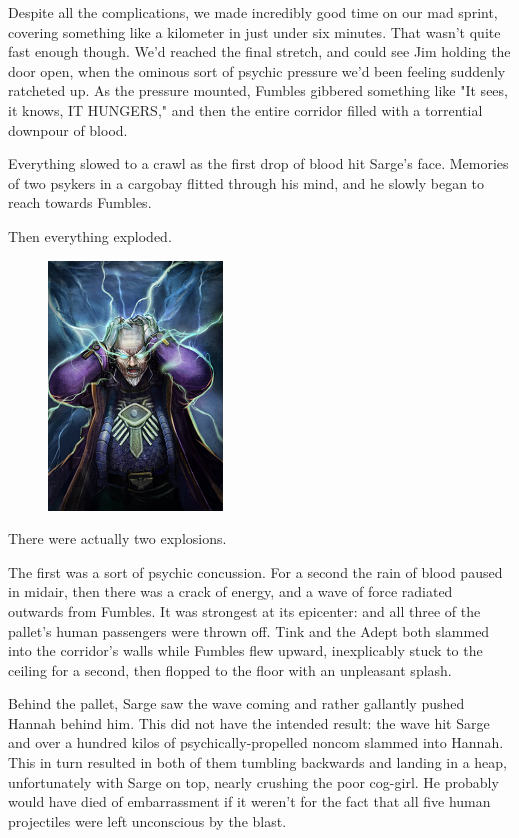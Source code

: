 Despite all the complications, we made incredibly good time on our mad sprint, covering something like a kilometer in just under six minutes. 
That wasn't quite fast enough though. 
We'd reached the final stretch, and could see Jim holding the door open, when the ominous sort of psychic pressure we'd been feeling suddenly ratcheted up. 
As the pressure mounted, Fumbles gibbered something like "It sees, it knows, IT HUNGERS," and then the entire corridor filled with a torrential downpour of blood. 


Everything slowed to a crawl as the first drop of blood hit Sarge's face. 
Memories of two psykers in a cargobay flitted through his mind, and he slowly began to reach towards Fumbles. 


Then everything exploded.
\begin{figure}
	\begin{center}
		\includegraphics[width=\figwidth]{pics/12/66.png}
	\end{center}
\end{figure}
There were actually two explosions. 


The first was a sort of psychic concussion. 
For a second the rain of blood paused in midair, then there was a crack of energy, and a wave of force radiated outwards from Fumbles. 
It was strongest at its epicenter: 
and all three of the pallet's human passengers were thrown off. 
Tink and the Adept both slammed into the corridor's walls while Fumbles flew upward, inexplicably stuck to the ceiling for a second, then flopped to the floor with an unpleasant splash. 


Behind the pallet, Sarge saw the wave coming and rather gallantly pushed Hannah behind him. 
This did not have the intended result: 
the wave hit Sarge and over a hundred kilos of psychically-propelled noncom slammed into Hannah. 
This in turn resulted in both of them tumbling backwards and landing in a heap, unfortunately with Sarge on top, nearly crushing the poor cog-girl. 
He probably would have died of embarrassment if it weren't for the fact that all five human projectiles were left unconscious by the blast.

